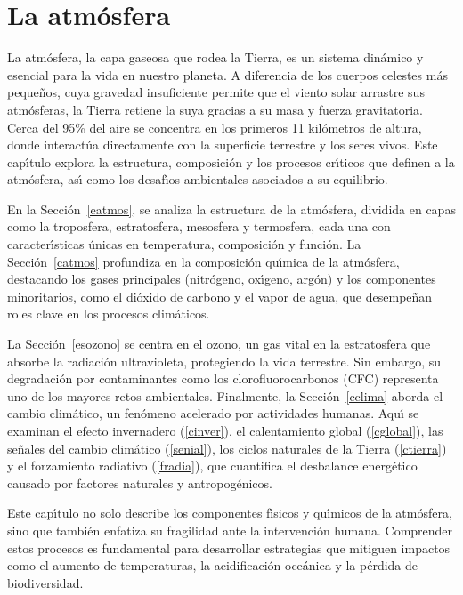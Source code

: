 \chapter{La atm\'osfera}
 
La atm\'osfera, la capa gaseosa que rodea la Tierra, es un sistema din\'amico y esencial para la vida en nuestro planeta. A diferencia de los cuerpos celestes m\'as peque\~nos, cuya gravedad insuficiente permite que el viento solar arrastre sus atm\'osferas, la Tierra retiene la suya gracias a su masa y fuerza gravitatoria. Cerca del 95\% del aire se concentra en los primeros 11 kil\'ometros de altura, donde interact\'ua directamente con la superficie terrestre y los seres vivos. Este cap\'{\i}tulo explora la estructura, composici\'on y los procesos cr\'{\i}ticos que definen a la atm\'osfera, as\'{\i} como los desaf\'{\i}os ambientales asociados a su equilibrio.

En la  Secci\'on~\ref{eatmos}, se analiza la estructura de la atm\'osfera, dividida en capas como la troposfera, estratosfera, mesosfera y termosfera, cada una con caracter\'{\i}sticas \'unicas en temperatura, composici\'on y funci\'on. La Secci\'on~\ref{catmos} profundiza en la composici\'on qu\'{\i}mica de la atm\'osfera, destacando los gases principales (nitr\'ogeno, ox\'{\i}geno, arg\'on) y los componentes minoritarios, como el di\'oxido de carbono y el vapor de agua, que desempe\~nan roles clave en los procesos clim\'aticos.

La Secci\'on~\ref{esozono} se centra en el ozono, un gas vital en la estratosfera que absorbe la radiaci\'on ultravioleta, protegiendo la vida terrestre. Sin embargo, su degradaci\'on por contaminantes como los clorofluorocarbonos (CFC) representa uno de los mayores retos ambientales. Finalmente, la Secci\'on~\ref{cclima} aborda el cambio clim\'atico, un fen\'omeno acelerado por actividades humanas. Aqu\'{\i} se examinan el efecto invernadero (\ref{cinver}), el calentamiento global (\ref{cglobal}), las se\~nales del cambio clim\'atico (\ref{senial}), los ciclos naturales de la Tierra (\ref{ctierra}) y el forzamiento radiativo (\ref{fradia}), que cuantifica el desbalance energ\'etico causado por factores naturales y antropog\'enicos.

Este cap\'{\i}tulo no solo describe los componentes f\'{\i}sicos y qu\'{\i}micos de la atm\'osfera, sino que tambi\'en enfatiza su fragilidad ante la intervenci\'on humana. Comprender estos procesos es fundamental para desarrollar estrategias que mitiguen impactos como el aumento de temperaturas, la acidificaci\'on oce\'anica y la p\'erdida de biodiversidad.

